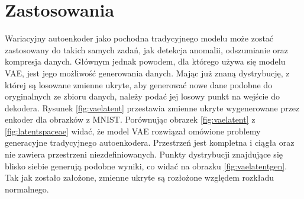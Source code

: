 \documentclass[a4paper,12pt,oneside]{book} %
\begin{document}
\section{Zastosowania}
Wariacyjny autoenkoder jako pochodna tradycyjnego modelu może zostać zastosowany do takich samych zadań, jak detekcja anomalii, odszumianie oraz kompresja danych. Głównym jednak powodem, dla którego używa się modelu VAE, jest jego możliwość generowania danych. Mając już znaną dystrybucję, z której są losowane zmienne ukryte, aby generować nowe dane podobne do oryginalnych ze zbioru danych, należy podać jej losowy punkt na wejście do dekodera. Rysunek \ref{fig:vaelatent} przestawia zmienne ukryte wygenerowane przez enkoder dla obrazków z MNIST. Porównując obrazek \ref{fig:vaelatent} z \ref{fig:latentspaceae} widać, że model VAE rozwiązał omówione problemy generacyjne tradycyjnego autoenkodera. Przestrzeń jest kompletna i ciągła oraz nie zawiera przestrzeni niezdefiniowanych. Punkty dystrybucji znajdujące się blisko siebie generują podobne wyniki, co widać na obrazku \ref{fig:vaelatentgen}. Tak jak zostało założone, zmienne ukryte są rozłożone względem rozkładu normalnego. 
\end{document}
